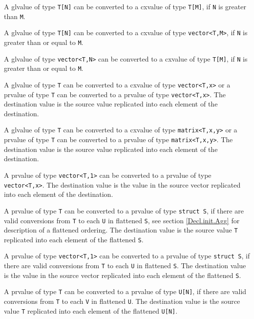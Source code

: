\p A glvalue of type \texttt{T[N]} can be converted to a cxvalue of type \texttt{T[M]},
if \texttt{N} is greater than \texttt{M}.

\p A glvalue of type \texttt{T[N]} can be converted to a cxvalue of type
\texttt{vector<T,M>}, if \texttt{N} is greater than or equal to \texttt{M}.

\p A glvalue of type \texttt{vector<T,N>} can be converted to a cxvalue of
type \texttt{T[M]}, if \texttt{N} is greater than or equal to \texttt{M}.


\p A glvalue of type \texttt{T} can be converted to a cxvalue of type
\texttt{vector<T,x>} or a prvalue of type \texttt{T} can be converted to a
prvalue of type \texttt{vector<T,x>}. The destination value is the source value
replicated into each element of the destination.

\p A glvalue of type \texttt{T} can be converted to a cxvalue of type
\texttt{matrix<T,x,y>} or a prvalue of type \texttt{T} can be converted to a
prvalue of type \texttt{matrix<T,x,y>}. The destination value is the source
value replicated into each element of the destination.

\p A prvalue of type \texttt{vector<T,1>} can be converted
to a prvalue of type \texttt{vector<T,x>}. The destination value is the value in
the source vector replicated into each element of the destination.


\p A prvalue of type \texttt{T} can be converted to a
prvalue of type \texttt{struct S}, if there are valid conversions from
\texttt{T} to each \texttt{U} in flattened \texttt{S}, see section
\ref{Decl.init.Agg} for description of a flattened ordering. The destination
value is the source value \texttt{T} replicated into each element of the
flattened \texttt{S}.

\p A prvalue of type \texttt{vector<T,1>} can be converted to a
prvalue of type \texttt{struct S}, if there are valid conversions from
\texttt{T} to each \texttt{U} in flattened \texttt{S}. The destination value is
the value in the source vector replicated into each element of the flattened
\texttt{S}.

\p A prvalue of type \texttt{T} can be converted to a
prvalue of type \texttt{U[N]}, if there are valid conversions from
\texttt{T} to each \texttt{V} in flattened \texttt{U}. The destination value
is the source value \texttt{T} replicated into each element of the flattened
\texttt{U[N]}.

